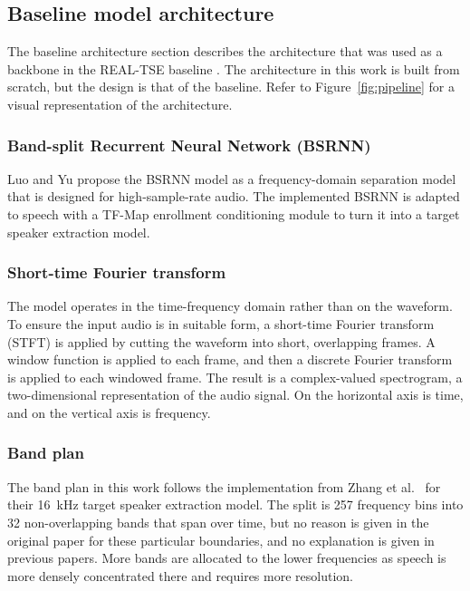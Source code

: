 \subsection{Baseline model architecture}
\label{sec:architecture}
The baseline architecture section describes the architecture that was used as a backbone in the REAL-TSE baseline \cite{wang2026realtse}. The architecture in this work is built from scratch, but the design is that of the baseline. Refer to Figure~\ref{fig:pipeline} for a visual representation of the architecture. 
\subsubsection{Band-split Recurrent Neural Network (BSRNN)}
\label{sec:bsrnn}
Luo and Yu \cite{luo2023music} propose the BSRNN model as a frequency-domain separation model that is designed for high-sample-rate audio. The implemented BSRNN is adapted to speech with a TF-Map enrollment conditioning module \cite{zhang2025multi} to turn it into a target speaker extraction model.


\subsubsection{Short-time Fourier transform}
\label{sec:stft}
The model operates in the time-frequency domain rather than on the waveform. To ensure the input audio is in suitable form, a short-time Fourier transform (STFT) is applied by cutting the waveform into short, overlapping frames. A window function is applied to each frame, and then a discrete Fourier transform is applied to each windowed frame. The result is a complex-valued spectrogram, a two-dimensional representation of the audio signal. On the horizontal axis is time, and on the vertical axis is frequency. 

\subsubsection{Band plan}
\label{sec:bandplan}
  The band plan in this work follows the implementation from Zhang et al.\ \cite{zhang2025multi} for their \SI{16}{\kHz} target speaker extraction model. The split is 257 frequency bins into 32 non-overlapping bands that span over time, but no reason is given in the original paper for these particular boundaries, and no explanation is given in previous papers. More bands are allocated to the lower frequencies as speech is more densely concentrated there and requires more resolution.

